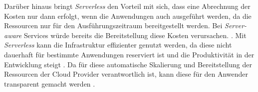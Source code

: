 Darüber hinaus bringt \textit{Serverless} den Vorteil mit sich, dass eine Abrechnung der Kosten nur dann erfolgt, wenn die Anwendungen auch ausgeführt werden, da die Ressourcen nur für den Ausführungszeitraum bereitgestellt werden. Bei \textit{Server-aware} Services würde bereits die Bereitstellung diese Kosten verursachen. \cite[Vgl.][S. 46]{Castro2019}. Mit \textit{Serverless} kann die Infrastruktur effizienter genutzt werden, da diese nicht dauerhaft für bestimmte Anwendungen reserviert ist und die Produktivität in der Entwicklung steigt \cite[Vgl.][S. 9]{Jonas2019}. Da für diese automatische Skalierung und Bereitstellung der Ressourcen der Cloud Provider verantwortlich ist, kann diese für den Anwender transparent gemacht werden \cite[Vgl.][S. 47]{Castro2019}.
\pagebreak